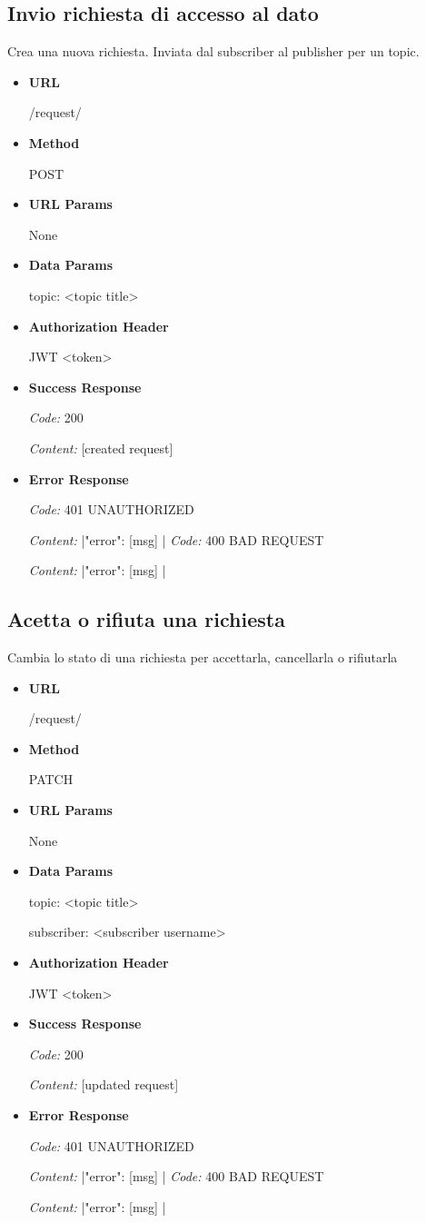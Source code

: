 \subsection{Invio richiesta di accesso al dato}
Crea una nuova richiesta. Inviata dal subscriber al publisher per un topic.
\begin{itemize}
\item \textbf{URL} \par
    /request/
\item \textbf{Method} \par
    POST
\item \textbf{URL Params} \par
    None
\item \textbf{Data Params} \par
    topic: <topic title>
\item \textbf{Authorization Header} \par
    JWT <token>
\item \textbf{Success Response} \par
    \emph{Code:} 200 \par
    \emph{Content:} [created request]
\item \textbf{Error Response} \par
    \emph{Code:} 401 UNAUTHORIZED \par
    \emph{Content:} |{"error": [msg] }|
    \emph{Code:} 400 BAD REQUEST \par
    \emph{Content:} |{"error": [msg] }|
\end{itemize}

\subsection{Acetta o rifiuta una richiesta}
Cambia lo stato di una richiesta per accettarla, cancellarla o rifiutarla
\begin{itemize}
\item \textbf{URL} \par
    /request/
\item \textbf{Method} \par
    PATCH
\item \textbf{URL Params} \par
    None
\item \textbf{Data Params} \par
    topic: <topic title> \par
    subscriber: <subscriber username>
\item \textbf{Authorization Header} \par
    JWT <token>
\item \textbf{Success Response} \par
    \emph{Code:} 200 \par
    \emph{Content:} [updated request]
\item \textbf{Error Response} \par
    \emph{Code:} 401 UNAUTHORIZED \par
    \emph{Content:} |{"error": [msg] }|
    \emph{Code:} 400 BAD REQUEST \par
    \emph{Content:} |{"error": [msg] }|
\end{itemize}

